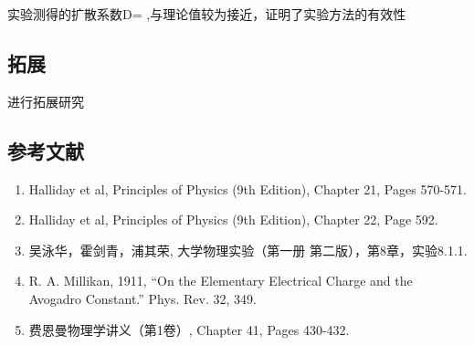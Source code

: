 \documentclass[12pt,a4paper,UTF8]{ctexart}
\begin{document}
实验测得的扩散系数D= ,与理论值较为接近，证明了实验方法的有效性
\subsection*{拓展}
进行拓展研究

\subsection*{参考文献}
\begin{enumerate}
    \item Halliday et al, Principles of Physics (9th Edition), Chapter 21, Pages 570-571.
    \item Halliday et al, Principles of Physics (9th Edition), Chapter 22, Page 592.
    \item 吴泳华，霍剑青，浦其荣, 大学物理实验（第一册 第二版），第8章，实验8.1.1.
    \item R. A. Millikan, 1911, “On the Elementary Electrical Charge and the Avogadro Constant.” Phys. Rev. 32, 349.
    \item 费恩曼物理学讲义（第1卷）, Chapter 41, Pages 430-432.
\end{enumerate}
\end{document}
